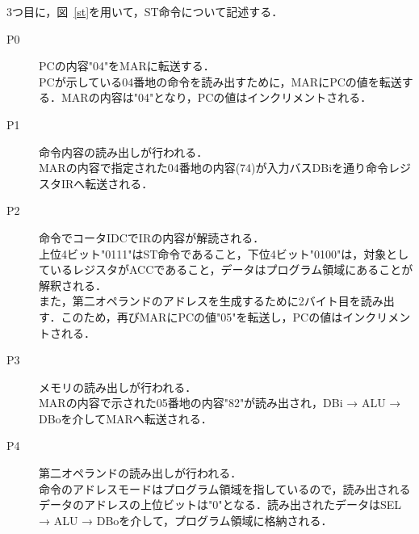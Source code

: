 \documentclass[dvipdfmx]{jsarticle}
\begin{document}
3つ目に，図~\ref{st}を用いて，ST命令について記述する．
\begin{description}
    \item[P0] PCの内容"04"をMARに転送する． \\ PCが示している04番地の命令を読み出すために，MARにPCの値を転送する．MARの内容は"04"となり，PCの値はインクリメントされる．
    \vspace{2mm}
    \item[P1] 命令内容の読み出しが行われる． \\ MARの内容で指定された04番地の内容(74)が入力バスDBiを通り命令レジスタIRへ転送される．
    \vspace{2mm}
    \item[P2] 命令でコータIDCでIRの内容が解読される． \\ 上位4ビット"0111"はST命令であること，下位4ビット"0100"は，対象としているレジスタがACCであること，データはプログラム領域にあることが解釈される． \\
    また，第二オペランドのアドレスを生成するために2バイト目を読み出す．このため，再びMARにPCの値"05"を転送し，PCの値はインクリメントされる．
    \vspace{2mm}
    \item[P3] メモリの読み出しが行われる． \\ MARの内容で示された05番地の内容"82"が読み出され，DBi → ALU → DBoを介してMARへ転送される．
    \vspace{2mm}
    \item[P4] 第二オペランドの読み出しが行われる． \\ 命令のアドレスモードはプログラム領域を指しているので，読み出されるデータのアドレスの上位ビットは"0"となる．読み出されたデータはSEL → ALU → DBoを介して，プログラム領域に格納される．
\end{description}
\end{document}
